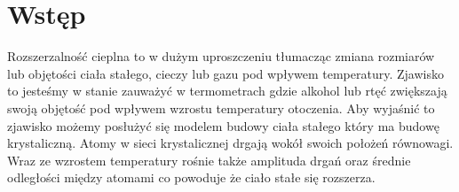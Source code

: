 \section{Wstęp}

Rozszerzalność cieplna to w dużym uproszczeniu tłumacząc zmiana rozmiarów lub objętości ciała stałego, cieczy lub gazu pod wpływem temperatury. Zjawisko to jesteśmy w stanie zauważyć w termometrach gdzie alkohol lub rtęć zwiększają swoją objętość pod wpływem wzrostu temperatury otoczenia. Aby wyjaśnić to zjawisko możemy posłużyć się modelem budowy ciała stałego który ma budowę krystaliczną. Atomy w sieci krystalicznej drgają wokół swoich położeń równowagi. Wraz ze wzrostem temperatury rośnie także amplituda drgań oraz średnie odległości między atomami co powoduje że ciało stałe się rozszerza.